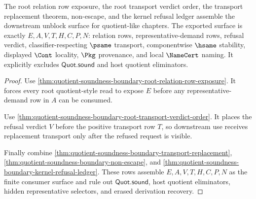 \begin{theorem}
\label{thm:quotient-soundness-boundary-root-downstream-unblock-surface}
The root relation row exposure, the root transport verdict order, the transport replacement theorem, non-escape, and the kernel refusal ledger assemble the downstream unblock surface for quotient-like chapters. The exported surface is exactly $E,A,V,T,H,C,P,N$: relation rows, representative-demand rows, refusal verdict, classifier-respecting $\psame$ transport, componentwise $\hsame$ stability, displayed $\Cont$ locality, $\Pkg$ provenance, and local $\NameCert$ naming. It explicitly excludes $\mathsf{Quot.sound}$ and host quotient eliminators.
\end{theorem}
\begin{proof}
Use \autoref{thm:quotient-soundness-boundary-root-relation-row-exposure}. It forces every root quotient-style read to expose $E$ before any representative-demand row in $A$ can be consumed.

Use \autoref{thm:quotient-soundness-boundary-root-transport-verdict-order}. It places the refusal verdict $V$ before the positive transport row $T$, so downstream use receives replacement transport only after the refused request is visible.

Finally combine \autoref{thm:quotient-soundness-boundary-transport-replacement}, \autoref{thm:quotient-soundness-boundary-non-escape}, and \autoref{thm:quotient-soundness-boundary-kernel-refusal-ledger}. These rows assemble $E,A,V,T,H,C,P,N$ as the finite consumer surface and rule out $\mathsf{Quot.sound}$, host quotient eliminators, hidden representative selectors, and erased derivation recovery.
\end{proof}

